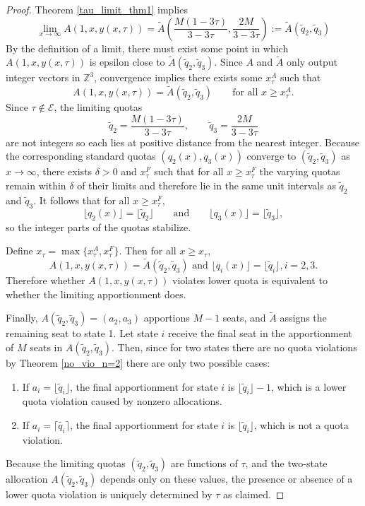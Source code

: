 \documentclass[11pt]{article}
\theoremstyle{definition}
\theoremstyle{definition}
\begin{document}
\begin{proof}
Theorem \ref{tau_limit_thm1} implies 
$$ \lim_{x \to \infty} A(1,x,y(x,\tau)) = \tilde{A}\left( \frac{M(1-3\tau)}{3-3\tau} , \frac{2M}{3-3\tau} \right) := \tilde{A}(\tilde{q}_2, \tilde{q}_3) $$
By the definition of a limit, there must exist some point in which $A(1,x,y(x,\tau))$ is epsilon close to $\tilde{A}(\tilde{q}_2,\tilde{q}_3)$. Since $A$ and $\tilde{A}$ only output integer vectors in $\mathbb{Z}^3$, convergence implies there exists some $x_{\tau}^A$ such that 
$$A(1,x,y(x,\tau)) = \tilde{A}(\tilde{q}_2,\tilde{q}_3) \qquad \text{for all } x \geq x^A_{\tau}.$$
Since $\tau \notin \mathcal{E}$, the limiting quotas
$$\tilde{q}_2=\frac{M(1-3\tau)}{3-3\tau}, \qquad 
\tilde{q}_3=\frac{2M}{3-3\tau}$$
are not integers so each lies at positive distance from the nearest integer. Because the corresponding standard quotas $(q_2(x),q_3(x))$ converge to $(\tilde{q}_2,\tilde{q}_3)$ as $x\to\infty$, there exists $\delta>0$ and $x_{\tau}^F$ such that for all $x \ge x_{\tau}^F$ the varying quotas remain within $\delta$ of their limits and therefore lie in the same unit intervals as $\tilde{q}_2$ and $\tilde{q}_3$. It follows that for all $x \ge x_{\tau}^F$,
$$\lfloor q_2(x) \rfloor = \lfloor \tilde{q}_2 \rfloor 
\qquad\text{and}\qquad
\lfloor q_3(x) \rfloor = \lfloor \tilde{q}_3 \rfloor,$$
so the integer parts of the quotas stabilize.

Define $x_\tau = \max\{x_{\tau}^A,x_{\tau}^F\}$. Then for all $x \geq x_\tau$, 
$$A(1,x,y(x,\tau)) = \tilde{A}(\tilde{q}_2,\tilde{q}_3) \text{ and } 
\lfloor q_i(x) \rfloor = \lfloor \tilde{q}_i \rfloor, i = 2,3.$$
Therefore whether $A(1,x,y(x,\tau))$ violates lower quota is equivalent to whether the limiting apportionment does. 

Finally, $A(\tilde{q}_2,\tilde{q}_3) = (a_2,a_3)$ apportions $M-1$ seats, and $\tilde{A}$ assigns the remaining seat to state 1. Let state $i$ receive the final seat in the apportionment of $M$ seats in $A(\tilde q_2, \tilde q_3)$. Then, since for two states there are no quota violations by Theorem \ref{no_vio_n=2} there are only two possible cases:
\begin{enumerate}
\item If $a_i = \lfloor \tilde{q}_i \rfloor$, the final apportionment for state $i$ is $\lfloor \tilde{q}_i \rfloor -1$, which is a lower quota violation caused by nonzero allocations.
\item If $a_i = \lceil \tilde{q_i} \rceil$, the final apportionment for state $i$ is $\lfloor \tilde{q}_i \rfloor$, which is not a quota violation.
\end{enumerate}

Because the limiting quotas $(\tilde{q}_2, \tilde{q}_3)$ are functions of $\tau$, and the two-state allocation $A(\tilde{q}_2, \tilde{q}_3)$ depends only on these values, the presence or absence of a lower quota violation is uniquely determined by $\tau$ as claimed.
\end{proof}
\end{document}
